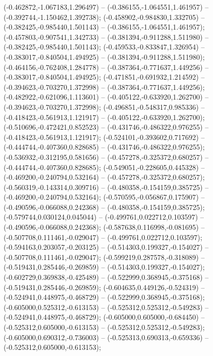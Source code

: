  (-0.462872,-1.067183,1.296497) -- (-0.386155,-1.064551,1.461957) -- (-0.392744,-1.150462,1.392738);
 (-0.458902,-0.984830,1.332705) -- (-0.382425,-0.985440,1.501143) -- (-0.386155,-1.064551,1.461957);
 (-0.457803,-0.907541,1.342733) -- (-0.381394,-0.911288,1.511980) -- (-0.382425,-0.985440,1.501143);
 (-0.459533,-0.833847,1.326954) -- (-0.383017,-0.840504,1.494925) -- (-0.381394,-0.911288,1.511980);
 (-0.464156,-0.762408,1.284778) -- (-0.387364,-0.771637,1.449256) -- (-0.383017,-0.840504,1.494925);
 (-0.471851,-0.691932,1.214592) -- (-0.394623,-0.703270,1.372998) -- (-0.387364,-0.771637,1.449256);
 (-0.482922,-0.621096,1.113601) -- (-0.405122,-0.633920,1.262700) -- (-0.394623,-0.703270,1.372998);
 (-0.496851,-0.548317,0.985336) -- (-0.418423,-0.561913,1.121917) -- (-0.405122,-0.633920,1.262700);
 (-0.510696,-0.472421,0.852523) -- (-0.431746,-0.486322,0.976255) -- (-0.418423,-0.561913,1.121917);
 (-0.524101,-0.393602,0.717692) -- (-0.444744,-0.407360,0.828685) -- (-0.431746,-0.486322,0.976255);
 (-0.536932,-0.312195,0.581656) -- (-0.457278,-0.325372,0.680257) -- (-0.444744,-0.407360,0.828685);
 (-0.549051,-0.228605,0.445328) -- (-0.469200,-0.240794,0.532164) -- (-0.457278,-0.325372,0.680257);
 (-0.560319,-0.143314,0.309716) -- (-0.480358,-0.154159,0.385725) -- (-0.469200,-0.240794,0.532164);
 (-0.570595,-0.056867,0.175907) -- (-0.490596,-0.066088,0.242368) -- (-0.480358,-0.154159,0.385725);
 (-0.579744,0.030124,0.045044) -- (-0.499761,0.022712,0.103597) -- (-0.490596,-0.066088,0.242368);
 (-0.587638,0.116998,-0.081695) -- (-0.507708,0.111461,-0.029047) -- (-0.499761,0.022712,0.103597);
 (-0.594163,0.203057,-0.203125) -- (-0.514303,0.199327,-0.154027) -- (-0.507708,0.111461,-0.029047);
 (-0.599219,0.287578,-0.318089) -- (-0.519431,0.285446,-0.269859) -- (-0.514303,0.199327,-0.154027);
 (-0.602729,0.369838,-0.425489) -- (-0.522999,0.368945,-0.375168) -- (-0.519431,0.285446,-0.269859);
 (-0.604635,0.449126,-0.524319) -- (-0.524941,0.448975,-0.468729) -- (-0.522999,0.368945,-0.375168);
 (-0.605000,0.525312,-0.613153) -- (-0.525312,0.525312,-0.549283) -- (-0.524941,0.448975,-0.468729);
 (-0.605000,0.605000,-0.684450) -- (-0.525312,0.605000,-0.613153) -- (-0.525312,0.525312,-0.549283);
 (-0.605000,0.690312,-0.736003) -- (-0.525313,0.690313,-0.659336) -- (-0.525312,0.605000,-0.613153);

